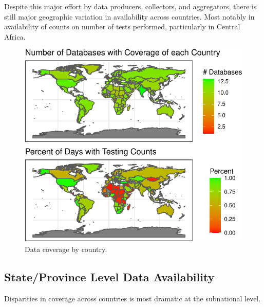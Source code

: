 \documentclass[
]{book}
\begin{document}
Despite this major effort by data producers, collectors, and aggregators, there is still major geographic variation in availability across countries. Most notably in availability of counts on number of tests performed, particularly in Central Africa.

\begin{figure}

{\centering \includegraphics[width=1\linewidth]{HowToBeCarefulWithCovid19Counts_files/figure-latex/nice-fig2-1} 

}

\caption{Data coverage by country.}\label{fig:nice-fig2}
\end{figure}

\hypertarget{stateprovince-level-data-availability}{%
\subsection{State/Province Level Data Availability}\label{stateprovince-level-data-availability}}

Disparities in coverage across countries is most dramatic at the subnational level.
\end{document}
